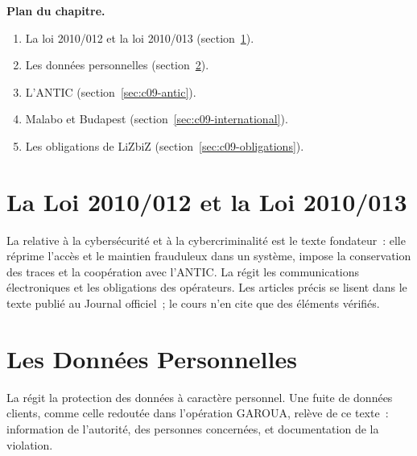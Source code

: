 \medskip
\textbf{Plan du chapitre.}
\begin{enumerate}
    \item La loi 2010/012 et la loi 2010/013 (section~\ref{sec:c09-lois}).
    \item Les données personnelles (section~\ref{sec:c09-donnees}).
    \item L'ANTIC (section~\ref{sec:c09-antic}).
    \item Malabo et Budapest (section~\ref{sec:c09-international}).
    \item Les obligations de LiZbiZ (section~\ref{sec:c09-obligations}).
\end{enumerate}

\separateur

\section{La Loi 2010/012 et la Loi 2010/013}
\label{sec:c09-lois}

\begin{boxjuris}
La  relative à la cybersécurité et
à la cybercriminalité est le texte fondateur~: elle réprime l'accès et le
maintien frauduleux dans un système, impose la conservation des traces et la
coopération avec l'ANTIC. La  régit les
communications électroniques et les obligations des opérateurs. Les articles
précis se lisent dans le texte publié au Journal officiel~; le cours n'en
cite que des éléments vérifiés.
\end{boxjuris}

\section{Les Données Personnelles}
\label{sec:c09-donnees}

\begin{boxjuris}
La  régit la protection des
données à caractère personnel. Une fuite de données clients, comme celle
redoutée dans l'opération GAROUA, relève de ce texte~: information de
l'autorité, des personnes concernées, et documentation de la violation.
\end{boxjuris}

